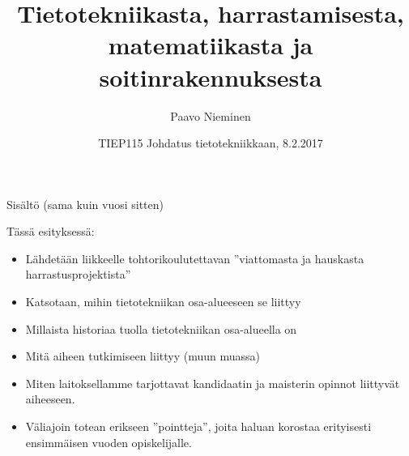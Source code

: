 \documentclass[pdf,9pt,handout]{beamer}
\title[TIEP115]
{Tietotekniikasta, harrastamisesta, matematiikasta ja soitinrakennuksesta}
\author{Paavo Nieminen}
\date{TIEP115 Johdatus tietotekniikkaan, 8.2.2017}
\begin{document}
\begin{frame}
  \titlepage
\end{frame}

\begin{frame}{Sisältö (sama kuin vuosi sitten)}
    \begin{minipage}{\textwidth}
       \linespread{1.4}
       \tableofcontents
    \end{minipage}
\end{frame}
\beamerdefaultoverlayspecification{<+->}

\begin{frame}{Tässä esityksessä:}
  \begin{itemize}
  \item Lähdetään liikkeelle tohtorikoulutettavan ''viattomasta ja
    hauskasta harrastusprojektista''
  \item Katsotaan, mihin tietotekniikan osa-alueeseen se liittyy
  \item Millaista historiaa tuolla tietotekniikan osa-alueella on
  \item Mitä aiheen tutkimiseen liittyy (muun muassa)
  \item Miten laitoksellamme tarjottavat kandidaatin ja maisterin
    opinnot liittyvät aiheeseen.
  \item Väliajoin totean erikseen ''pointteja'', joita haluan korostaa
    erityisesti ensimmäisen vuoden opiskelijalle.
  \end{itemize}
\end{frame}
\end{document}

